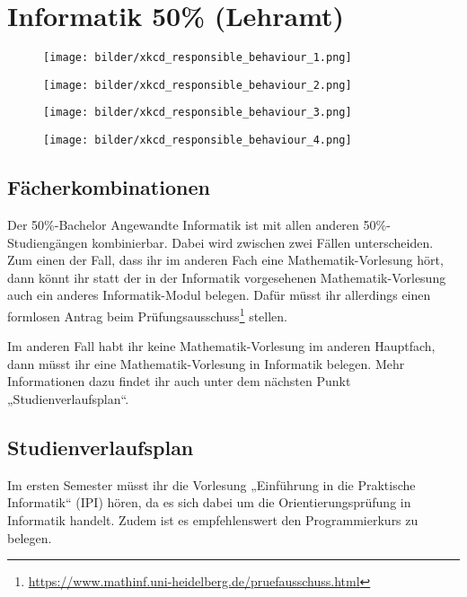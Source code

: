 \section{Informatik 50\% (Lehramt)}

\begin{figure*}[t]
    \centering
    \begin{subfigure}{.24\textwidth}
    		\centering
		\texttt{[image: bilder/xkcd\_responsible\_behaviour\_1.png]}
    \end{subfigure}
    \begin{subfigure}{.24\textwidth}
	    \centering
	    \texttt{[image: bilder/xkcd\_responsible\_behaviour\_2.png]}
    \end{subfigure}
    \begin{subfigure}{.25\textwidth}
	    \centering
	    \texttt{[image: bilder/xkcd\_responsible\_behaviour\_3.png]}
    \end{subfigure}
    \begin{subfigure}{.25\textwidth}
	    \centering
	    \texttt{[image: bilder/xkcd\_responsible\_behaviour\_4.png]}
    \end{subfigure}
\end{figure*}

\subsection{Fächerkombinationen}
Der 50\%-Bachelor Angewandte Informatik ist mit allen anderen 50\%-Studiengängen kombinierbar. Dabei wird zwischen zwei Fällen unterscheiden. Zum einen der Fall, dass ihr im anderen Fach eine Mathematik-Vorlesung hört, dann könnt ihr statt der in der Informatik vorgesehenen Mathematik-Vorlesung auch ein anderes Informatik-Modul belegen. Dafür müsst ihr allerdings einen formlosen Antrag beim Prüfungsausschuss\footnote{\url{https://www.mathinf.uni-heidelberg.de/pruefausschuss.html}} stellen. 

Im anderen Fall habt ihr keine Mathematik-Vorlesung im anderen Hauptfach, dann müsst ihr eine Mathematik-Vorlesung in Informatik belegen. Mehr Informationen dazu findet ihr auch unter dem nächsten Punkt „Studienverlaufsplan“.

\subsection{Studienverlaufsplan}
Im ersten Semester müsst ihr die Vorlesung „Einführung in die Praktische Informatik“ (\gls{IPI}) hören, da es sich dabei um die Orientierungsprüfung in Informatik handelt. Zudem ist es empfehlenswert den Programmierkurs zu belegen. 

